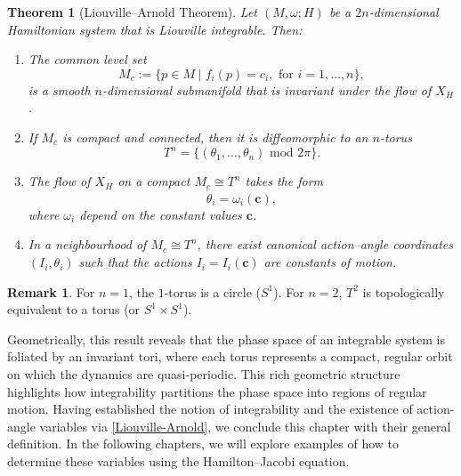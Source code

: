 \documentclass[12pt,oneside]{report}
\newtheorem{theorem}{Theorem}[section]  %
\theoremstyle{definition}
\newtheorem{remark}{Remark}
\begin{document}
\begin{theorem}[Liouville–Arnold Theorem]\label{Liouville-Arnold}
Let $(M,\omega;H)$ be a $2n$-dimensional Hamiltonian system that is Liouville integrable. Then:
\begin{enumerate}
    \item The common level set 
    $$
    M_c := \{ p \in M \mid f_i(p) = c_i ,\text{ for } i = 1,\dots,n \},
    $$
    is a smooth $n$-dimensional submanifold that is invariant under the flow of $X_H$.
    \item If $M_c$ is compact and connected, then it is diffeomorphic to an $n$-torus
    $$
    T^n = \{ (\theta_1,\dots,\theta_n) \,\, \text{mod}\,\, 2\pi \}.
    $$
    \item The flow of $X_H$ on a compact $M_c\cong T^n$ takes the form
    $$
    \dot{\theta}_i = \omega_i(\mathbf{c}),
    $$
    where $\omega_i$ depend on the constant values $\mathbf{c}$.
    \item In a neighbourhood of $M_c\cong T^n$, there exist canonical {action–angle coordinates} $(I_i,\theta_i)$ such that the actions $I_i=I_i(\mathbf{c})$ are constants of motion.
\end{enumerate}
\end{theorem}
\begin{remark}
For $n=1$, the $1$-torus is a circle ($S^1$). For $n=2$, $T^2$ is topologically equivalent to a torus (or $S^1\times S^1$).  
\end{remark}
Geometrically, this result reveals that the phase space of an integrable system is foliated by an invariant tori, where each torus represents a compact, regular orbit on which the dynamics are quasi-periodic. This rich geometric structure highlights how integrability partitions the phase space into regions of regular motion. Having established the notion of integrability and the existence of action-angle variables via \autoref{Liouville-Arnold}, we conclude this chapter with their general definition. In the following chapters, we will explore examples of how to determine these variables using the Hamilton–Jacobi equation.
\end{document}
